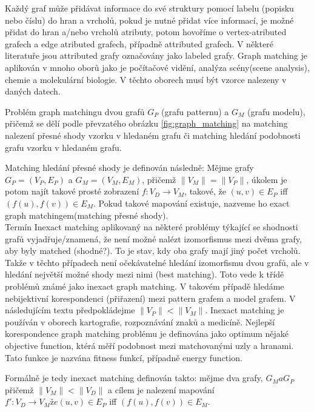\documentclass[11pt,twoside,a4paper]{book}
\begin{document}
 Každý graf může přidávat informace do své struktury pomocí labelu (popisku
 nebo číslu) do hran a vrcholů, pokud je nutné přidat více informací, je možné
 přidat do hran a/nebo vrcholů atributy, potom hovoříme o vertex-atributed
 grafech a edge atributed grafech, případně attributed grafech. V některé
 literatuře jsou attributed grafy označovány jako labeled grafy. Graph
 matching je aplikován v mnoho oborů jako je počítačové vidění, analýza
 scény(scene analysis), chemie a molekulární biologie. V těchto oborech musí být
 vzorce nalezeny v daných datech. 
  
 Problém graph matchingu dvou grafů $G_P$ (grafu patternu) a $G_M$ (grafu
 modelu), přičemž se dělí podle převzatého obrázku \ref{fig:graph_matching} na
 matching nalezení přesné shody vzorku v hledaném grafu či matching hledání
 podobnosti grafu vzorku v hledaném grafu.
 
 Matching hledání přesné shody je definován následně: Mějme grafy $G_P = (V_P ,
 E_P)$ a $G_M = (V_M, E_M)$, přičemž $\| V_M\| = \| V_P\|$, úkolem je potom
 najít takové prosté zobrazení  $f: V_D \rightarrow V_M$, takové, že $(u, v) \in
 E_P$ iff $(f(u), f(v)) \in E_M$. Pokud takové mapování existuje, nazveme ho
 exact graph matchingem(matching přesné shody). \\
 
 Termín Inexact matching aplikovaný na některé problémy týkající se shodnosti
 grafů vyjadřuje/znamená, že není možné nalézt izomorfismus mezi dvěma grafy,
 aby byly matched (shodné?). To je stav, kdy oba grafy mají jiný počet vrcholů.
 Takže v těchto případech není očekávatelné hledání izomorfismu dvou grafů, ale
 v hledání největší možné shody mezi nimi (best matching).
 Toto vede k třídě problémů známé jako inexact graph matching. V takovém
 případě hledáme nebijektivní korespondenci (přiřazení) mezi pattern grafem a
 model grafem. V následujícím textu předpokládejme $\|V_P\| < \|V_M\|$. Inexact
 matching je používán v oborech kartografie, rozpoznávání znaků a medicíně.
 Nejlepší korespondence graph matching problému je definována jako optimum
 nějaké objective function, ktérá měří podobnost mezi matchovanými uzly a
 hranami. Tato funkce je nazvána fitness funkcí, případně energy function.

 Formálně je tedy inexact matching definován takto: mějme dva grafy, $G_M a G_P$
 přičemž $\| V_M \| < \| V_D\|$ a cílem je nalezení mapování $f' : V_D 
\rightarrow V_M že (u, v) \in E_P$ iff $(f(u), f(v)) \in E_M$.\\
 
\end{document}
